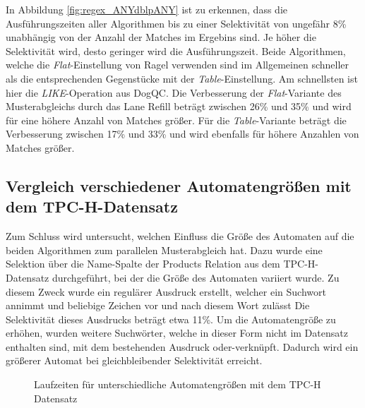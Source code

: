 In Abbildung \ref{fig:regex_ANYdblpANY} ist zu erkennen, dass die Ausführungszeiten aller Algorithmen bis zu einer Selektivität von ungefähr 8\% unabhängig von der Anzahl der Matches im Ergebins sind.
Je höher die Selektivität wird, desto geringer wird die Ausführungszeit.
Beide Algorithmen, welche die \emph{Flat}-Einstellung von Ragel verwenden sind im Allgemeinen schneller als die entsprechenden Gegenstücke mit der \emph{Table}-Einstellung.
Am schnellsten ist hier die \emph{LIKE}-Operation aus DogQC.
Die Verbesserung der \emph{Flat}-Variante des Musterabgleichs durch das Lane Refill beträgt zwischen 26\% und 35\% und wird für eine höhere Anzahl von Matches größer.
Für die \emph{Table}-Variante beträgt die Verbesserung zwischen 17\% und 33\% und wird ebenfalls für höhere Anzahlen von Matches größer.

\subsection{Vergleich verschiedener Automatengrößen mit dem TPC-H-Datensatz}

Zum Schluss wird untersucht, welchen Einfluss die Größe des Automaten auf die beiden Algorithmen zum parallelen Musterabgleich hat.
Dazu wurde eine Selektion über die Name-Spalte der Products Relation aus dem TPC-H-Datensatz durchgeführt, bei der die Größe des Automaten variiert wurde.
Zu diesem Zweck wurde ein regulärer Ausdruck erstellt, welcher ein Suchwort annimmt und beliebige Zeichen vor und nach diesem Wort zulässt
Die Selektivität dieses Ausdrucks beträgt etwa 11\%.
Um die Automatengröße zu erhöhen, wurden weitere Suchwörter, welche in dieser Form nicht im Datensatz enthalten sind, mit dem bestehenden Ausdruck oder-verknüpft.
Dadurch wird ein größerer Automat bei gleichbleibender Selektivität erreicht.


\begin{figure}[ht]
	\centering
	\caption{Laufzeiten für unterschiedliche Automatengrößen mit dem TPC-H Datensatz}
	\label{fig:regex_p_name}
\end{figure}

